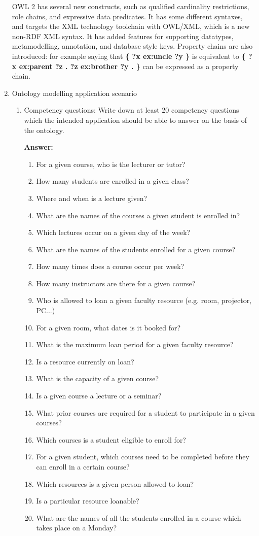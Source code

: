 \documentclass[10pt,a4paper]{article}
\begin{document}
\begin{enumerate}
OWL 2 has several new constructs, such as qualified cardinality restrictions, role chains, and expressive data predicates. It has some different syntaxes, and targets the XML technology toolchain with OWL/XML, which is a new non-RDF XML syntax. It has added features for supporting datatypes, metamodelling, annotation, and database style keys. Property chains are also introduced: for example saying that \textbf{\{ ?x ex:uncle ?y \}} is equivalent to \textbf{\{ ?x ex:parent ?z . ?z ex:brother ?y . \}} can be expressed as a property chain.

\item Ontology modelling application scenario

\begin{enumerate}

\item Competency questions: Write down at least 20 competency questions which the intended application should be able to answer on the basis of the ontology.

\textbf{Answer:}

\begin{enumerate}

\item For a given course, who is the lecturer or tutor?
\item  How many students are enrolled in a given class?
\item Where and when is a lecture given?
\item What are the names of the courses a given student is enrolled in?
\item Which lectures occur on a given day of the week?
\item What are the names of the students enrolled for a given course?
\item How many times does a course occur per week?
\item How many instructors are there for a given course?
\item Who is allowed to loan a given faculty resource (e.g. room, projector, PC...)
\item For a given room, what dates is it booked for?
\item What is the maximum loan period for a given faculty resource?
\item Is a resource currently on loan?
\item What is the capacity of a given course?
\item Is a given course a lecture or a seminar?
\item What prior courses are required for a student to participate in a given courses?
\item Which courses is a student eligible to enroll for?
\item For a given student, which courses need to be completed before they can enroll in a certain course?
\item Which resources is a given person allowed to loan?
\item Is a particular resource loanable?
\item What are the names of all the students enrolled in a course which takes place on a Monday?
\end{enumerate}


\end{enumerate}
\end{enumerate}
\end{document}
